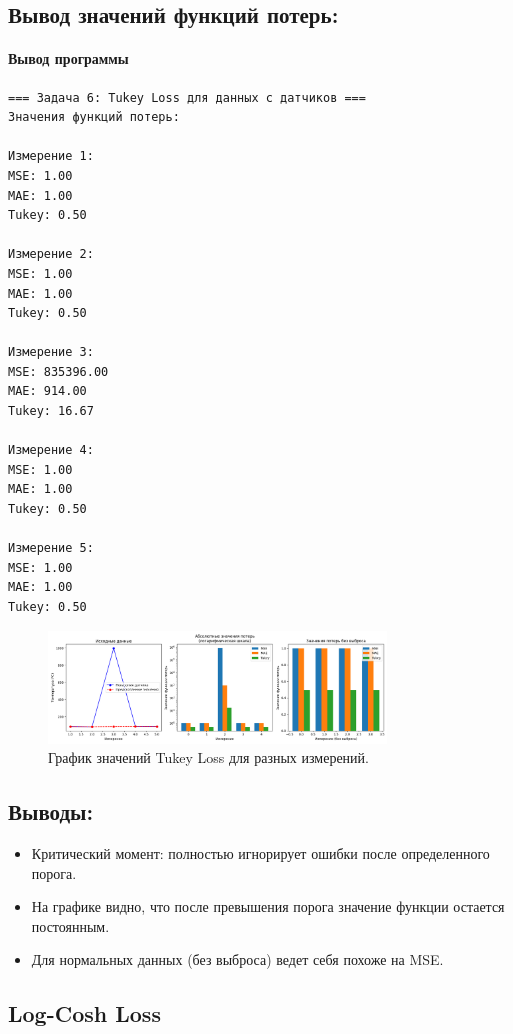 \documentclass[12pt]{article}
\theoremstyle{definition}
\theoremstyle{definition}
\theoremstyle{definition}
\theoremstyle{remark}
\theoremstyle{remark}
\begin{document}
\subsection*{Вывод значений функций потерь:}
\paragraph{Вывод программы}
\begin{verbatim}
=== Задача 6: Tukey Loss для данных с датчиков ===
Значения функций потерь:

Измерение 1:
MSE: 1.00
MAE: 1.00
Tukey: 0.50

Измерение 2:
MSE: 1.00
MAE: 1.00
Tukey: 0.50

Измерение 3:
MSE: 835396.00
MAE: 914.00
Tukey: 16.67

Измерение 4:
MSE: 1.00
MAE: 1.00
Tukey: 0.50

Измерение 5:
MSE: 1.00
MAE: 1.00
Tukey: 0.50
\end{verbatim}

\begin{figure}[h!]
    \centering
    \includegraphics[width=0.8\textwidth]{imgs/tukey.png}
    \caption{График значений Tukey Loss для разных измерений.}
\end{figure}

\subsection*{Выводы:}
\begin{itemize}
    \item Критический момент: полностью игнорирует ошибки после определенного порога.
    \item На графике видно, что после превышения порога значение функции остается постоянным.
    \item Для нормальных данных (без выброса) ведет себя похоже на MSE.
\end{itemize}

\subsection{Log-Cosh Loss}
\end{document}
